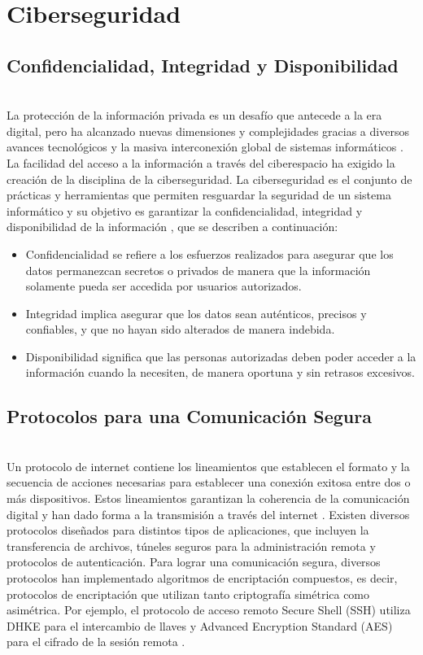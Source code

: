 \section{Ciberseguridad}

\subsection{Confidencialidad, Integridad y Disponibilidad}
\hfil \\
La protección de la información privada es un desafío que antecede
a la era digital, pero ha alcanzado nuevas dimensiones y complejidades gracias
a diversos avances tecnológicos y la masiva interconexión global de sistemas
informáticos \cite{greenbergCrashOverrideMalware2017,ibmCostDataBreach2023,jinUnderstandingIoTSecurity2022}. La facilidad del acceso a la información a través del ciberespacio
ha exigido la creación de la disciplina de la ciberseguridad. La ciberseguridad
es el conjunto de prácticas y herramientas que permiten resguardar la seguridad
de un sistema informático y su objetivo es garantizar la confidencialidad,
integridad y disponibilidad de la información \cite{jironAPLICACIONESREDESNEURONALES2023}, que se describen a continuación:
\begin{itemize}
    \item Confidencialidad se refiere a los esfuerzos realizados para asegurar que los datos permanezcan secretos o privados de manera que la información solamente pueda ser accedida por usuarios autorizados.
    \item Integridad implica asegurar que los datos sean auténticos, precisos y confiables, y que no hayan sido alterados de manera indebida.
    \item Disponibilidad significa que las personas autorizadas deben poder acceder a la información cuando la necesiten, de manera oportuna y sin retrasos excesivos. %
\end{itemize}




\subsection{Protocolos para una Comunicación Segura}
\hfil \\
Un protocolo de internet contiene los lineamientos que establecen el formato
y la secuencia de acciones necesarias para establecer una conexión exitosa
entre dos o más dispositivos. Estos lineamientos garantizan la coherencia de la comunicación digital y han dado forma a la transmisión a través del internet \cite{schweitzer-2002}.
Existen diversos protocolos diseñados para distintos tipos de
aplicaciones, que incluyen la transferencia de archivos, túneles seguros para la administración remota y protocolos de autenticación. Para lograr una comunicación segura, diversos protocolos
han implementado algoritmos de encriptación compuestos, es decir, protocolos de encriptación que utilizan tanto criptografía
simétrica como asimétrica. Por ejemplo, el protocolo de acceso remoto Secure Shell (SSH) utiliza DHKE para el intercambio de llaves y Advanced Encryption Standard (AES) para el cifrado de la sesión remota \cite{paar-2011}.

